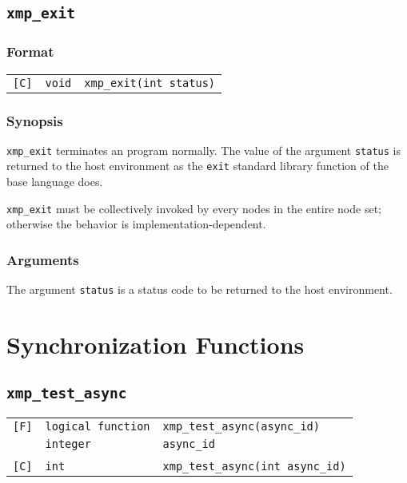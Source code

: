 \subsection{{\tt xmp\_exit}}
\label{subsec: xmp_exit}

\subsubsection*{Format}

\begin{tabular}{lll}

\verb![C]!&  {\tt void}& {\tt xmp\_exit(int status)}\\

\end{tabular}

\subsubsection*{Synopsis}

{\tt xmp\_exit} terminates an {\XMP} program normally.
The value of the argument {\tt status} is returned to the host
environment as the {\tt exit} standard library function of the base
language does.

{\tt xmp\_exit} must be collectively invoked by every nodes in the
entire node set; otherwise the behavior is implementation-dependent.

\subsubsection*{Arguments}

The argument {\tt status} is a status code to be returned to the host
environment.


\section{Synchronization Functions}

\subsection{\tt xmp\_test\_async}

\begin{tabular}{lll}

\verb![F]!& {\tt logical function} & {\tt xmp\_test\_async(async\_id)}\\
          & {\tt integer} & {\tt async\_id}\\
          & & \\
\verb![C]!&  {\tt int} & {\tt  xmp\_test\_async(int async\_id)}

\end{tabular}

